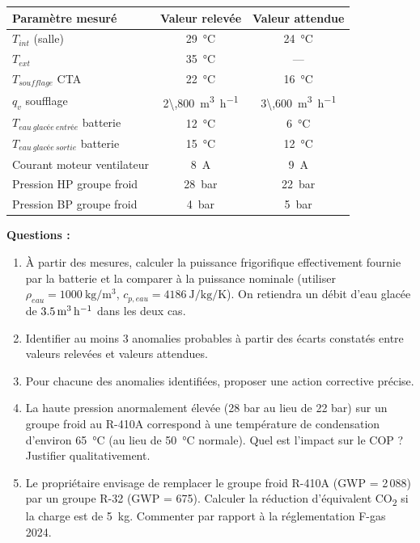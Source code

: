 \begin{center}
\begin{tabular}{lcc}
  \toprule
  Paramètre mesuré & Valeur relevée & Valeur attendue \\
  \midrule
  $T_{int}$ (salle) & \SI{29}{\celsius} & \SI{24}{\celsius} \\
  $T_{ext}$ & \SI{35}{\celsius} & — \\
  $T_{soufflage}$ CTA & \SI{22}{\celsius} & \SI{16}{\celsius} \\
  $q_v$ soufflage & \SI{2\,800}{\metre\cubed\per\hour} & \SI{3\,600}{\metre\cubed\per\hour} \\
  $T_{eau\ glacée\ entrée}$ batterie & \SI{12}{\celsius} & \SI{6}{\celsius} \\
  $T_{eau\ glacée\ sortie}$ batterie & \SI{15}{\celsius} & \SI{12}{\celsius} \\
  Courant moteur ventilateur & \SI{8}{\ampere} & \SI{9}{\ampere} \\
  Pression HP groupe froid & \SI{28}{\bar} & \SI{22}{\bar} \\
  Pression BP groupe froid & \SI{4}{\bar} & \SI{5}{\bar} \\
  \bottomrule
\end{tabular}
\end{center}

\textbf{Questions :}

\begin{enumerate}
  \item À partir des mesures, calculer la puissance frigorifique effectivement fournie par la batterie et la comparer à la puissance nominale (utiliser $\rho_{eau} = \SI{1000}{\kilogram\per\metre\cubed}$, $c_{p,eau} = \SI{4186}{\joule\per\kilogram\per\kelvin}$). On retiendra un débit d'eau glacée de $\SI{3{,}5}{\metre\cubed\per\hour}$ dans les deux cas.
  \item Identifier au moins 3 anomalies probables à partir des écarts constatés entre valeurs relevées et valeurs attendues.
  \item Pour chacune des anomalies identifiées, proposer une action corrective précise.
  \item La haute pression anormalement élevée (28 bar au lieu de 22 bar) sur un groupe froid au R-410A correspond à une température de condensation d'environ \SI{65}{\celsius} (au lieu de \SI{50}{\celsius} normale). Quel est l'impact sur le COP ? Justifier qualitativement.
  \item Le propriétaire envisage de remplacer le groupe froid R-410A (GWP = 2\,088) par un groupe R-32 (GWP = 675). Calculer la réduction d'équivalent CO\textsubscript{2} si la charge est de \SI{5}{\kilogram}. Commenter par rapport à la réglementation F-gas 2024.
\end{enumerate}

